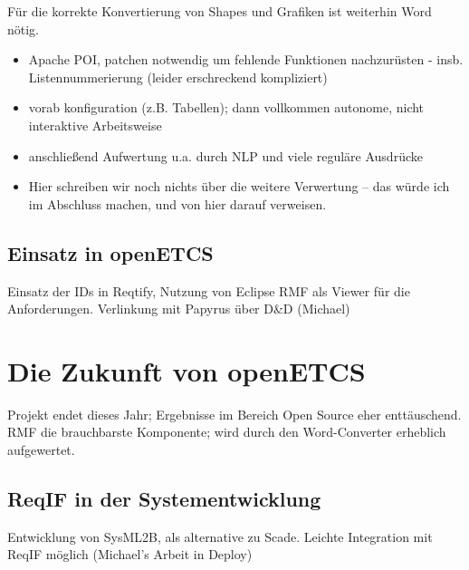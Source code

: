 \documentclass[twoside]{article}
\begin{document}
\begin{multicols}{2}
Für die korrekte Konvertierung von Shapes und Grafiken ist weiterhin Word nötig.

\begin{itemize}
\item Apache POI, patchen notwendig um fehlende Funktionen nachzurüsten - insb. Listennummerierung (leider erschreckend kompliziert)
\item vorab konfiguration (z.B. Tabellen); dann vollkommen autonome, nicht interaktive Arbeitsweise
\item anschließend Aufwertung u.a. durch NLP und viele reguläre Ausdrücke
\item Hier schreiben wir noch nichts über die weitere Verwertung – das würde ich im Abschluss machen, und von hier darauf verweisen.
\end{itemize}


\subsection{Einsatz in openETCS}

Einsatz der IDs in Reqtify, Nutzung von Eclipse RMF als Viewer für die Anforderungen. Verlinkung mit Papyrus über D\&D (Michael)

\section{Die Zukunft von openETCS}

Projekt endet dieses Jahr; Ergebnisse im Bereich Open Source eher enttäuschend. RMF die brauchbarste Komponente; wird durch den Word-Converter erheblich aufgewertet.

\subsection{ReqIF in der Systementwicklung}

Entwicklung von SysML2B, als alternative zu Scade.  Leichte Integration mit ReqIF möglich (Michael's Arbeit in Deploy)


\end{multicols}
\end{document}
